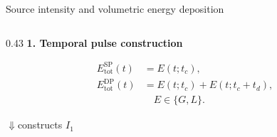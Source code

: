 \documentclass[aspectratio=169,10pt]{beamer}
\begin{document}
\begingroup
{}
\begin{frame}[t]{Source intensity and volumetric energy deposition}
  \vspace{-0.12cm}
  \noindent\hspace*{-0.45cm}%
  \begin{minipage}[t]{\dimexpr\textwidth+0.59cm\relax}
  \begin{columns}[T,totalwidth=0.99\linewidth]
    \begin{column}{0.43\linewidth}
      \small\textbf{1. Temporal pulse construction}\par
      \vspace{0.08cm}
      \scriptsize
      \[
        \begin{aligned}
          E_{\mathrm{tot}}^{\mathrm{SP}}(t)&=E(t;t_c),\\[-0.05cm]
          E_{\mathrm{tot}}^{\mathrm{DP}}(t)&=E(t;t_c)+E(t;t_c+t_d),\\[-0.05cm]
          &\quad E\in\{G,L\}.
        \end{aligned}
      \]
      \vspace{-0.15cm}
      {\centering\textcolor{GVSourceBlue}{\(\Downarrow\)}\quad\textcolor{GVSlate}{constructs \(I_1\)}\par}
      \vspace{0.25cm}


\end{column}
\end{columns}
\end{minipage}
\end{frame}
\end{document}
